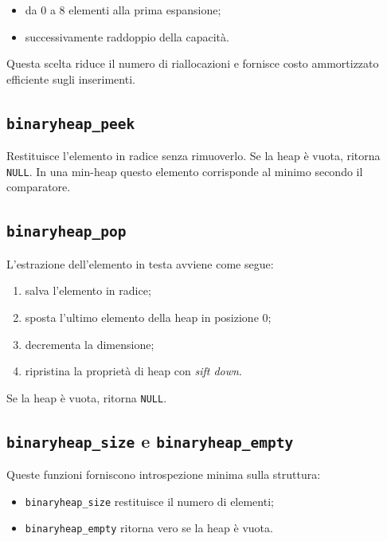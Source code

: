 \documentclass[a4paper,12pt]{article}
\begin{document}
\begin{itemize}[leftmargin=*]
    \item da \(0\) a \(8\) elementi alla prima espansione;
    \item successivamente raddoppio della capacità.
\end{itemize}

Questa scelta riduce il numero di riallocazioni e fornisce costo ammortizzato efficiente sugli inserimenti.

\subsection{\texttt{binaryheap\_peek}}

Restituisce l'elemento in radice senza rimuoverlo. Se la heap è vuota, ritorna \texttt{NULL}. In una min-heap questo elemento corrisponde al minimo secondo il comparatore.

\subsection{\texttt{binaryheap\_pop}}

L'estrazione dell'elemento in testa avviene come segue:

\begin{enumerate}[leftmargin=*]
    \item salva l'elemento in radice;
    \item sposta l'ultimo elemento della heap in posizione \(0\);
    \item decrementa la dimensione;
    \item ripristina la proprietà di heap con \emph{sift down}.
\end{enumerate}

Se la heap è vuota, ritorna \texttt{NULL}.

\subsection{\texttt{binaryheap\_size} e \texttt{binaryheap\_empty}}

Queste funzioni forniscono introspezione minima sulla struttura:

\begin{itemize}[leftmargin=*]
    \item \texttt{binaryheap\_size} restituisce il numero di elementi;
    \item \texttt{binaryheap\_empty} ritorna vero se la heap è vuota.
\end{itemize}
\end{document}
